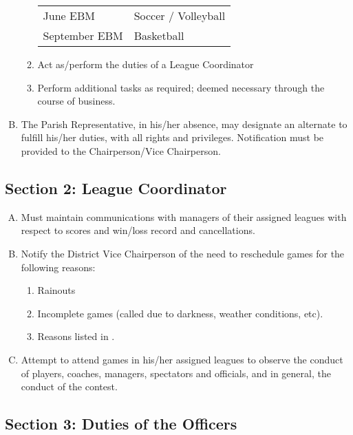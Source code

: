 \begin{enumerate}[A.]
\begin{enumerate}[1.]
\begin{center}
\begin{tabular}{l l}
                June EBM & Soccer / Volleyball \\
                September EBM & Basketball \\
                \hline
            \end{tabular}
        \end{center}
        \item Act as/perform the duties of a League Coordinator
        \item Perform additional tasks as required; deemed necessary through the course of business.
    \end{enumerate}
    \item The Parish Representative, in his/her absence, may designate an alternate to fulfill his/her duties, with all rights and privileges.  Notification must be provided to the Chairperson/Vice Chairperson.
\end{enumerate}

\subsection{Section 2: League Coordinator}
\label{ssec:rules-g-2}
\begin{enumerate}[A.]
    \item Must maintain communications with managers of their assigned leagues with respect to scores and win/loss   record and cancellations. 
    \item Notify the District Vice Chairperson of the need to reschedule games for the following reasons:
    \begin{enumerate}[1.]
        \item Rainouts
        \item Incomplete games (called due to darkness, weather conditions, etc).
        \item Reasons listed in .
    \end{enumerate}
    \item Attempt to attend games in his/her assigned leagues to observe the conduct of players, coaches, managers, spectators and officials, and in general, the conduct of the contest.
\end{enumerate}

\subsection{Section 3: Duties of the Officers}
\label{ssec:rules-g-3}
